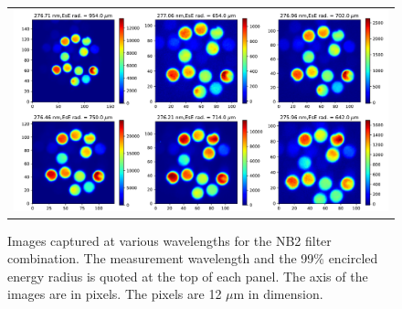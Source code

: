 \documentclass[12pt]{spieman}  %
\begin{document}
\begin{figure}[ht!]
\begin{center}
\begin{tabular}{c}
\includegraphics[width=\linewidth]{nb2_images.pdf}
\end{tabular}
\end{center}
\caption 
{ \label{fig:nb2_images} Images captured at various wavelengths for the NB2 filter combination. The measurement wavelength and the 99\% encircled energy radius is quoted at the top of each panel. The axis of the images are in pixels. The pixels are 12 $\mu$m in dimension.} 
\end{figure}
\end{document}
